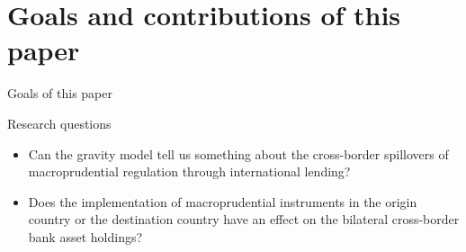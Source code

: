 \documentclass{beamer}
\begin{document}


\section{Goals and contributions of this paper}


\begin{frame}{Goals of this paper}

\begin{block}{Research questions}
\begin{itemize}
\item Can the gravity model tell us something about the cross-border spillovers of macroprudential regulation through international lending?
\item Does the implementation of macroprudential instruments in the origin country or the destination country have an effect on the bilateral cross-border bank asset holdings?
\end{itemize}
\end{block}

\end{frame}
\end{document}
